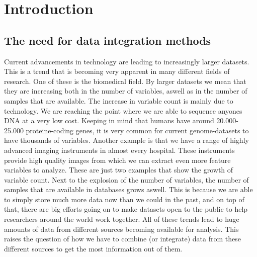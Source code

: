\chapter{Introduction}
\label{cha:intro}
\section{The need for data integration methods}
Current advancements in technology are leading to increasingly larger datasets\cite{collins2003vision}. This is a trend that is becoming very apparent in many different fields of research. One of these is the biomedical field. By larger datasets we mean that they are increasing both in the number of variables, aswell as in the number of samples that are available. The increase in variable count is mainly due to technology. We are reaching the point where we are able to sequence anyones DNA at a very low cost\cite{shendure2008next}. Keeping in mind that humans have around 20.000-25.000 proteine-coding genes, it is very common for current genome-datasets to have thousands of variables. Another example is that we have a range of highly advanced imaging instruments in almost every hospital\cite{black1993advances}\cite{medicalimaging}. These instruments provide high quality images from which we can extract even more feature variables to analyze. These are just two examples that show the growth of variable count. Next to the explosion of the number of variables, the number of samples that are available in databases grows aswell. This is because we are able to simply store much more data now than we could in the past, and on top of that, there are big efforts going on to make datasets open to the public to help researchers around the world work together\cite{stark2006biogrid}\cite{sandelin2004jaspar}\cite{tcga}\cite{smith2007obo}. All of these trends lead to huge amounts of data from different sources becoming available for analysis. This raises the question of how we have to combine (or integrate) data from these different sources to get the most information out of them.
